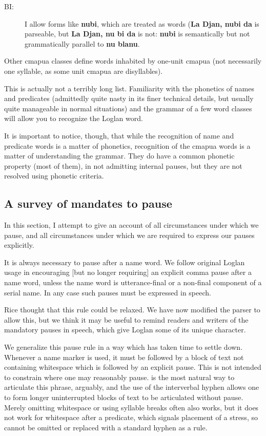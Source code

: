 \documentclass[12pt]{book}
\begin{document}
{\begin{description}
\item[BI:]  I allow forms like {\bf nubi}, which are treated as words ({\bf La Djan, nubi da} is parseable, but {\bf La Djan, nu bi da} is not:  {\bf nubi} is semantically but not grammatically parallel to {\bf nu blanu}.

\end{description}

Other cmapua classes define words inhabited by one-unit cmapua (not necessarily one syllable, as some unit cmapua are disyllables).

This is actually not a terribly long list.  Familiarity with the phonetics of names and predicates (admittedly quite nasty in its finer technical details, but usually quite manageable in normal situations) and the grammar of a few word classes will allow you to recognize the Loglan word.   

It is important to notice, though, that while the recognition of name and predicate words is a matter of phonetics, recognition of the cmapua words is a matter of understanding the grammar.  They do have a common phonetic property (most of them), in not admitting internal pauses, but they are not resolved using phonetic criteria.

\newpage

\subsection{A survey of mandates to pause}

In this section, I attempt to give an account of all circumstances under which we pause, and all circumstances under which we are required to express our pauses explicitly.

It is always necessary to pause after a name word.  We follow original Loglan usage in encouraging [but no longer requiring]
an explicit comma pause after a name word, unless the name word is utterance-final or a non-final component of a serial name.  In any case such pauses must be expressed in speech.

Rice thought that this rule could be relaxed.  We have now modified the parser to allow this, but we think it may be useful to remind readers and writers of the mandatory pauses in speech, which give Loglan some of its unique character.

We generalize this pause rule in a way which has taken time to settle down.  Whenever a name marker is used, it must be followed by a block of text not containing whitespace which is followed by an explicit pause.  This is not intended to constrain where one may reasonably pause.   is the most natural way to articulate this phrase, arguably, and the use of the interverbal hyphen allows one to form longer uninterrupted blocks of text to be articulated without pause.  Merely omitting whitespace or using syllable breaks often also works, but it does not work for whitespace after a predicate, which signals placement of a stress, so cannot be omitted or replaced with a standard hyphen as a rule.

}
\end{document}
